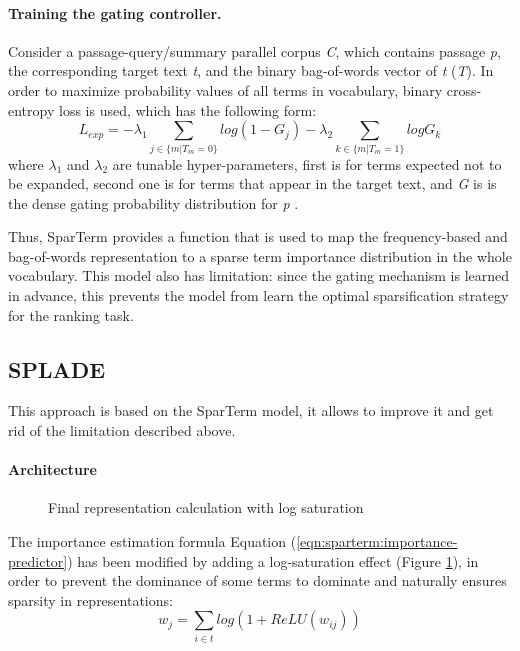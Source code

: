 \documentclass[
    twocolumn,
]{ceurart}
\begin{document}
    \paragraph{Training the gating controller.}
    Consider a passage-query/summary parallel corpus \emph{C}, which contains passage \emph{p}, the
    corresponding target text \emph{t}, and the binary bag-of-words vector of \emph{t} (\emph{T}).
    In order to maximize probability values of all terms in vocabulary, binary cross-entropy loss
    is used, which has the following form:
    \begin{equation}
        L_{exp}=-\lambda_1\sum_{j \in \{m|T_m=0\}}log(1-G_j)-\lambda_2\sum_{k \in \{m|T_m=1\}}logG_k
    \end{equation}
    where $\lambda_1$ and $\lambda_2$ are tunable hyper-parameters, first is for terms expected not to be
    expanded, second one is for terms that appear in the target text, and \emph{G} is is the dense
    gating probability distribution for \emph{p} \cite{SparTerm}.\\\par
    Thus, SparTerm provides a function that is used to map the frequency-based and bag-of-words
    representation to a sparse term importance distribution in the whole vocabulary.
    This model also has limitation: since the gating mechanism is learned in advance, this prevents
    the model from learn the optimal sparsification strategy for the ranking task.

    \subsection{SPLADE}

    This approach is based on the SparTerm model, it allows to improve it and get rid
    of the limitation described above.

    \paragraph{Architecture}
    \begin{figure}[h]
        \centering
        \def\svgwidth{\columnwidth}
        
        \caption{Final representation calculation with log saturation}
        \label{fig:SPLADE}
    \end{figure}
    The importance estimation formula Equation (\ref{eqn:sparterm:importance-predictor})
    has been modified by adding a log-saturation effect (Figure \ref{fig:SPLADE}), in order to
    prevent the dominance of some terms to dominate and naturally ensures sparsity in
    representations:
    \begin{equation}
        w_j=\sum_{i \in t}log(1+ReLU(w_{ij}))
    \end{equation}
\end{document}
